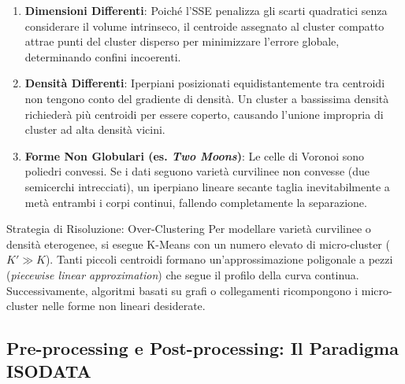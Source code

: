 \begin{enumerate}
    \item \textbf{Dimensioni Differenti}: Poiché l'SSE penalizza gli scarti quadratici senza considerare il volume intrinseco, il centroide assegnato al cluster compatto attrae punti del cluster disperso per minimizzare l'errore globale, determinando confini incoerenti.
    \item \textbf{Densità Differenti}: Iperpiani posizionati equidistantemente tra centroidi non tengono conto del gradiente di densità. Un cluster a bassissima densità richiederà più centroidi per essere coperto, causando l'unione impropria di cluster ad alta densità vicini.
    \item \textbf{Forme Non Globulari (es. \textit{Two Moons})}: Le celle di Voronoi sono poliedri convessi. Se i dati seguono varietà curvilinee non convesse (due semicerchi intrecciati), un iperpiano lineare secante taglia inevitabilmente a metà entrambi i corpi continui, fallendo completamente la separazione.
\end{enumerate}

\begin{noteblock}{Strategia di Risoluzione: Over-Clustering}
Per modellare varietà curvilinee o densità eterogenee, si esegue K-Means con un numero elevato di micro-cluster ($K' \gg K$). Tanti piccoli centroidi formano un'approssimazione poligonale a pezzi (\textit{piecewise linear approximation}) che segue il profilo della curva continua. Successivamente, algoritmi basati su grafi o collegamenti ricompongono i micro-cluster nelle forme non lineari desiderate.
\end{noteblock}

\subsection{Pre-processing e Post-processing: Il Paradigma ISODATA}

